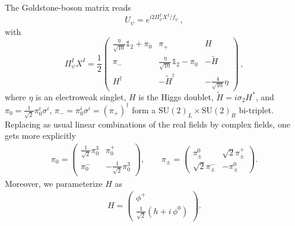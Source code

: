 \documentclass[preprintnumbers,nofootinbib,showpacs,eqsecnum,pre,12pt]{revtex4-1}
\newcommand{\SU}{\text{SU}}
\newcommand{\id}{\mathbb{1}}
\begin{document}
The Goldstone-boson matrix reads 
\begin{equation}
U_\psi = e^{i 2 \Pi^I_\psi X^I/f_\psi} \, , 
\end{equation}
with
\begin{equation}
\Pi^I_\psi X^I= \frac{1}{2}\begin{pmatrix}
\frac{\eta}{\sqrt{10}}\id_2+\pi_0 & \pi_+ & H \\
	\pi_- & \frac{\eta}{\sqrt{10}}\id_2-\pi_0  & -\tilde{H} \\
		H^\dagger & -\tilde{H}^\dagger & - \frac{4}{\sqrt{10}} \eta
\end{pmatrix}\, , 
\end{equation}
where $\eta$ is an electroweak singlet, $H$ is the Higgs doublet, $\tilde{H} = i \sigma_2 H^*$, and $\pi_0=\frac{1}{\sqrt{2}} \pi^i_0\sigma^i$, $\pi_-= \pi^i_0\sigma^i=\left(\pi_+\right)^\dagger$ form a $\SU(2)_L\times \SU(2)_R$ bi-triplet. Replacing as usual linear combinations of the real fields by complex fields, one gets more explicitly 
\begin{align}
\pi_0 = \begin{pmatrix} 
\frac{1}{\sqrt{2}} \pi^3_0 & \pi^+_0 \\ \pi^-_0 & -  \frac{1}{\sqrt{2}} \pi^3_0
\end{pmatrix}, \qquad  \pi_\pm = \begin{pmatrix} 
\pi^0_\pm & \sqrt{2}\pi^+_\pm \\ \sqrt{2} \pi^-_\pm & - \pi^0_\pm
\end{pmatrix} .
\end{align}
Moreover, we parameterize $H$ as
\begin{align}
H = \begin{pmatrix} \phi^+ \\ \frac{1}{\sqrt{2}} \left( h + i\, \phi^0 \right)\end{pmatrix}.
\end{align}
\end{document}
